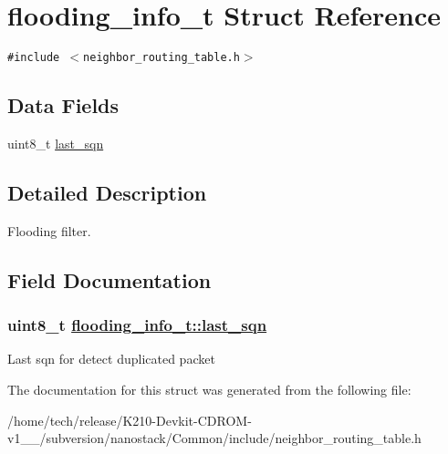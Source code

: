 \hypertarget{structflooding__info__t}{
\section{flooding\_\-info\_\-t Struct Reference}
\label{structflooding__info__t}
}
{\tt \#include $<$neighbor\_\-routing\_\-table.h$>$}

\subsection*{Data Fields}
\begin{CompactItemize}
\item 
uint8\_\-t \hyperlink{structflooding__info__t_6718f265896281cd2d48b337197dfbee}{last\_\-sqn}
\end{CompactItemize}


\subsection{Detailed Description}
Flooding filter. 



\subsection{Field Documentation}
\hypertarget{structflooding__info__t_6718f265896281cd2d48b337197dfbee}{
\subsubsection[last\_\-sqn]{\setlength{\rightskip}{0pt plus 5cm}uint8\_\-t \hyperlink{structflooding__info__t_6718f265896281cd2d48b337197dfbee}{flooding\_\-info\_\-t::last\_\-sqn}}}
\label{structflooding__info__t_6718f265896281cd2d48b337197dfbee}


Last sqn for detect duplicated packet 

The documentation for this struct was generated from the following file:\begin{CompactItemize}
\item 
/home/tech/release/K210-Devkit-CDROM-v1\_\_/subversion/nanostack/Common/include/neighbor\_\-routing\_\-table.h\end{CompactItemize}
